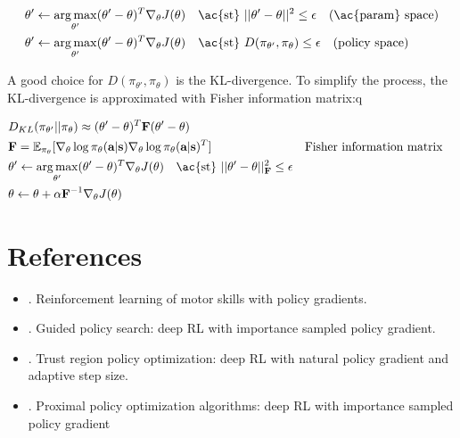 \begin{align}
	&\theta' \leftarrow \underset{\theta'}{\arg\max} (\theta'-\theta)^T \nabla_\theta J(\theta) \quad \text{\ac{st} } ||\theta' - \theta||^2 \leq \epsilon \quad \text{(\ac{param} space)}\\
	&\theta' \leftarrow \underset{\theta'}{\arg\max} (\theta'-\theta)^T \nabla_\theta J(\theta) \quad \text{\ac{st} } D(\pi_{\theta'}, \pi_{\theta}) \leq \epsilon \quad \text{(policy space)}
\end{align}

A good choice for $D(\pi_{\theta'}, \pi_{\theta})$ is the \ac{KL}-divergence. To simplify the process, the \ac{KL}-divergence is approximated with Fisher information matrix:q

\begin{align}
	& D_{KL}(\pi_{\theta'} || \pi_{\theta}) \approx (\theta' - \theta)^T \textbf{F} (\theta' - \theta)\\
	& \textbf{F} = \mathbb{E}_{\pi_{\theta}} [ \nabla_\theta \log\pi_\theta(\textbf{a}|\textbf{s}) \nabla_\theta \log \pi_\theta (\textbf{a}|\textbf{s})^T ] && \text{Fisher information matrix}\\
	& \theta' \leftarrow \underset{\theta'}{\arg\max} (\theta'-\theta)^T \nabla_\theta J(\theta) \quad \text{\ac{st} } ||\theta' - \theta||^2_\textbf{F} \leq \epsilon\\
	& \theta \leftarrow \theta + \alpha \textbf{F}^{-1} \nabla_\theta J(\theta)
\end{align}

\section{References}
\begin{itemize}
	\item {}. Reinforcement learning of motor skills with policy gradients.
	\item {}. Guided policy search: deep \ac{RL} with importance sampled policy gradient.
	\item {}. Trust region policy optimization: deep \ac{RL} with natural policy gradient and adaptive step size.
	\item {}. Proximal policy optimization algorithms: deep \ac{RL} with importance sampled policy gradient
\end{itemize}